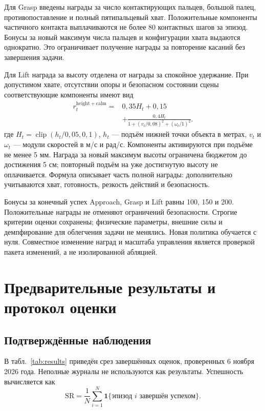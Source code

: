 \documentclass{misisarticle}
\begin{document}
Для Grasp введены награды за число контактирующих пальцев, большой палец, противопоставление и полный пятипальцевый хват. Положительные компоненты частичного контакта выплачиваются не более 80 контактных шагов за эпизод. Бонусы за новый максимум числа пальцев и конфигурации хвата выдаются однократно. Это ограничивает получение награды за повторение касаний без завершения задачи.

Для Lift награда за высоту отделена от награды за спокойное удержание. При допустимом хвате, отсутствии опоры и безопасном состоянии сцены соответствующие компоненты имеют вид
\begin{equation}
 \begin{split}
 r^{\mathrm{height+calm}}_t={}&0{,}35H_t+0{,}15\\
 &+\frac{0{,}4H_t}{1+(v_t/0{,}08)^2+(\omega_t/1)^2}.
 \end{split}
\end{equation}
где $H_t=\operatorname{clip}(h_t/0{,}05,0,1)$, $h_t$ --- подъём нижней точки объекта в метрах, $v_t$ и $\omega_t$ --- модули скоростей в м/с и рад/с. Компоненты активируются при подъёме не менее 5 мм. Награда за новый максимум высоты ограничена бюджетом до достижения 5 см; повторный подъём на уже достигнутую высоту не оплачивается. Формула описывает часть полной награды: дополнительно учитываются хват, готовность, резкость действий и безопасность.

Бонусы за конечный успех Approach, Grasp и Lift равны 100, 150 и 200. Положительные награды не отменяют ограничений безопасности. Строгие критерии оценки сохранены; физические параметры, внешние силы и демпфирование для облегчения задачи не менялись. Новая политика обучается с нуля. Совместное изменение наград и масштаба управления является проверкой пакета изменений, а не изолированной абляцией.

\section{Предварительные результаты и протокол оценки}
\subsection{Подтверждённые наблюдения}
В табл.~\ref{tab:results} приведён срез завершённых оценок, проверенных 6 ноября 2026 года. Неполные журналы не используются как результаты. Успешность вычисляется как
\begin{equation}
 \mathrm{SR}=\frac{1}{N}\sum_{i=1}^{N}\mathbf{1}\{\text{эпизод }i\text{ завершён успехом}\}.
\end{equation}
\end{document}
